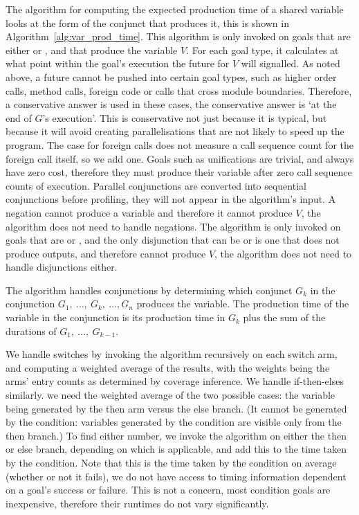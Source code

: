 The algorithm for computing the expected production time
of a shared variable looks at the form of the conjunct that produces it,
this is shown in Algorithm~\ref{alg:var_prod_time}.
This algorithm is only invoked on goals that are either \ddet or \dccmulti,
and that produce the variable $V$.
For each goal type,
it calculates at what point within the goal's execution
the future for $V$ will signalled.
As noted above,
a future cannot be pushed into certain goal types,
such as higher order calls, method calls,
foreign code or calls that cross module boundaries.
Therefore, a conservative answer is used in these cases,
the conservative answer is `at the end of $G$'s execution'.
This is conservative not just because it is typical,
but because it will avoid creating parallelisations that are not likely
to speed up the program.
The case for foreign calls does not measure a call sequence count for the
foreign call itself, so we add one.
Goals such as unifications are trivial, and always have zero cost,
therefore they must produce their variable after zero call sequence counts
of execution.
Parallel conjunctions are converted into sequential conjunctions before
profiling,
they will not appear in the algorithm's input.
A negation cannot produce a variable and therefore it cannot produce $V$,
the algorithm does not need to handle negations.
The algorithm is only invoked on goals that are \ddet or \dccmulti,
and the only disjunction that can be \ddet or \dccmulti is one that does not
produce outputs,
and therefore cannot produce $V$,
the algorithm does not need to handle disjunctions either.

The algorithm handles conjunctions by determining which conjunct
$G_k$ in the conjunction $G_1,~\ldots,~G_k,~\ldots,G_n$ produces the
variable.
The production time of the variable in the conjunction is its production
time in $G_k$ plus the sum of the durations of $G_1,~\ldots,~G_{k-1}$.

We handle switches by invoking the algorithm recursively on each switch
arm,
and computing a weighted average of the results,
with the weights being the arms' entry counts as determined by coverage
inference.
We handle if-then-elses similarly.
we need the weighted average of the two possible cases:
the variable being generated by the then arm versus the else branch.
(It cannot be generated by the condition:
variables generated by the condition are visible only from the then branch.)
To find either number,
we invoke the algorithm on either the then or else branch,
depending on which is applicable,
and add this to the time taken by the condition.
Note that this is the time taken by the condition on average
(whether or not it fails),
we do not have access to timing information dependent on a goal's success or
failure.
This is not a concern, most condition goals are inexpensive,
therefore their runtimes do not vary significantly.

